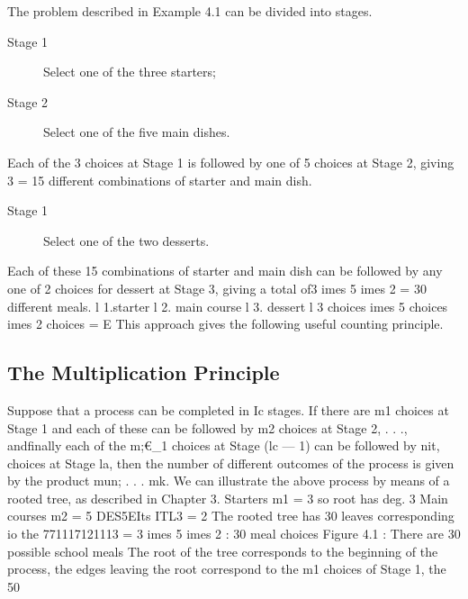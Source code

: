 \documentclass{beamer}
\begin{document}
The problem described in Example 4.1 can be divided into stages.
\begin{description}
\item[Stage 1] Select one of the three starters;
\item[Stage 2] Select one of the ﬁve main dishes.
\end{description}
Each of the 3 choices at Stage 1 is followed by one of 5 choices
at Stage 2, giving 3  = 15 different combinations of starter
and main dish.

\begin{description}
\item[Stage 1] Select one of the two desserts.
\end{description}
Each of these 15 combinations of starter and main dish can be
followed by any one of 2 choices for dessert at Stage 3, giving a
total of3 	imes 5 	imes 2 = 30 different meals.
l 1.starter l 2. main course l 3. dessert l
3 choices 	imes 5 choices 	imes 2 choices = E
This approach gives the following useful counting principle.

\subsection{The Multiplication Principle}
Suppose that a process can be completed in Ic stages. If there are m1
choices at Stage 1 and each of these can be followed by m2 choices at
Stage 2, . . ., andﬁnally each of the m;€_1 choices at Stage (lc — 1) can
be followed by nit, choices at Stage la, then the number of different
outcomes of the process is given by the product mun; . . . mk.
We can illustrate the above process by means of a rooted tree, as
described in Chapter 3.
Starters
m1 = 3
so root has deg. 3
Main courses
m2 = 5
DES5EIts
ITL3 = 2
The rooted tree has 30 leaves
corresponding io the 771117121113 = 3 	imes 5 	imes 2 : 30 meal choices
Figure 4.1 : There are 30 possible school meals
The root of the tree corresponds to the beginning of the process, the
edges leaving the root correspond to the m1 choices of Stage 1, the
50
\end{document}
